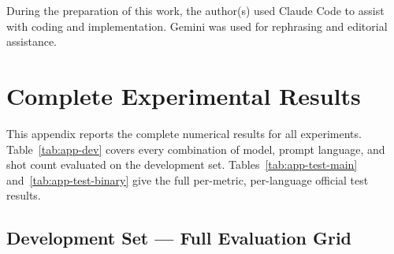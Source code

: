 \documentclass[
]{ceurart}
\theoremstyle{definition}
\begin{document}
 During the preparation of this work, the author(s) used Claude Code to assist with coding and implementation. Gemini was used for rephrasing and editorial assistance.


\clearpage
\appendix
\renewcommand{\thesection}{Appendix~\Alph{section}}

\section{Complete Experimental Results}
\label{app:full-results}

This appendix reports the complete numerical results for all experiments.
Table~\ref{tab:app-dev} covers every combination of model, prompt language, and shot count evaluated on the development set.
Tables~\ref{tab:app-test-main} and~\ref{tab:app-test-binary} give the full per-metric, per-language official test results.


\subsection{Development Set --- Full Evaluation Grid}
\label{app:dev-grid}
\end{document}

